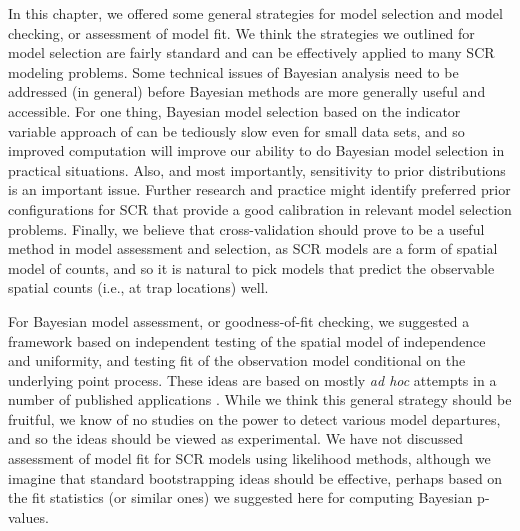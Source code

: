 In this chapter, we offered some general strategies for model
selection and model checking, or assessment of model fit.  We think
the strategies we outlined for model selection are fairly standard
and can be effectively applied to many SCR modeling problems.
Some technical issues of Bayesian analysis need to be addressed (in
general) before Bayesian methods are more generally useful and
accessible.  For one thing, Bayesian model selection based on the
indicator variable approach of \citet{kuo_mallick:1998} can be
tediously slow even for small data sets, and so improved computation
will improve our ability to do Bayesian model selection in practical
situations.  Also, and most importantly, sensitivity to prior
distributions is an important issue. Further research and practice
might identify preferred prior configurations for SCR that provide a
good calibration in relevant model selection problems.
Finally, we believe that 
cross-validation should prove to be a useful method in model
assessment and selection, 
as SCR models are a form of spatial model of counts, and so it is
natural to pick models that predict the observable spatial counts
(i.e., at trap locations) well.

For Bayesian model assessment, or goodness-of-fit checking, we
suggested a framework based on independent testing of the spatial
model of independence and uniformity, and testing fit of the
observation model conditional on the underlying point process.  These
ideas are based on mostly {\it ad hoc} attempts in a number of
published applications \citep[e.g.,]{royle_etal:2009ecol,
  royle_etal:2011mee, gopalaswamy_etal:2012ecol, russell_etal:2012}.
While we think this general strategy should be fruitful, we know of no
studies on the power to detect various model departures, and so the
ideas should be viewed as experimental. We have not discussed
assessment of model fit for SCR models using likelihood methods,
although we imagine that standard bootstrapping ideas should be
effective, perhaps based on the fit statistics (or similar ones) we
suggested here for computing Bayesian p-values.

